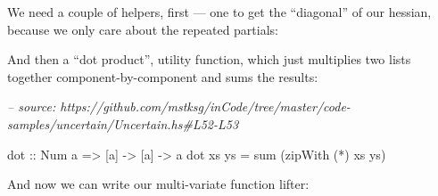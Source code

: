 \documentclass[]{article}
\newenvironment{Shaded}{}{}
\newcommand{\CommentTok}[1]{\textcolor[rgb]{0.38,0.63,0.69}{\textit{#1}}}
\newcommand{\DataTypeTok}[1]{\textcolor[rgb]{0.56,0.13,0.00}{#1}}
\newcommand{\DecValTok}[1]{\textcolor[rgb]{0.25,0.63,0.44}{#1}}
\newcommand{\FunctionTok}[1]{\textcolor[rgb]{0.02,0.16,0.49}{#1}}
\newcommand{\KeywordTok}[1]{\textcolor[rgb]{0.00,0.44,0.13}{\textbf{#1}}}
\newcommand{\NormalTok}[1]{#1}
\newcommand{\OtherTok}[1]{\textcolor[rgb]{0.00,0.44,0.13}{#1}}
\begin{document}
We need a couple of helpers, first --- one to get the ``diagonal'' of our
hessian, because we only care about the repeated partials:

\begin{Shaded}
\end{Shaded}

And then a ``dot product'', utility function, which just multiplies two lists
together component-by-component and sums the results:

\begin{Shaded}
\begin{Highlighting}[]
\CommentTok{-- source: https://github.com/mstksg/inCode/tree/master/code-samples/uncertain/Uncertain.hs#L52-L53}

\OtherTok{dot ::} \DataTypeTok{Num}\NormalTok{ a }\OtherTok{=>}\NormalTok{ [a] }\OtherTok{->}\NormalTok{ [a] }\OtherTok{->}\NormalTok{ a}
\NormalTok{dot xs ys }\FunctionTok{=}\NormalTok{ sum (zipWith (}\FunctionTok{*}\NormalTok{) xs ys)}
\end{Highlighting}
\end{Shaded}

And now we can write our multi-variate function lifter:
\end{document}
